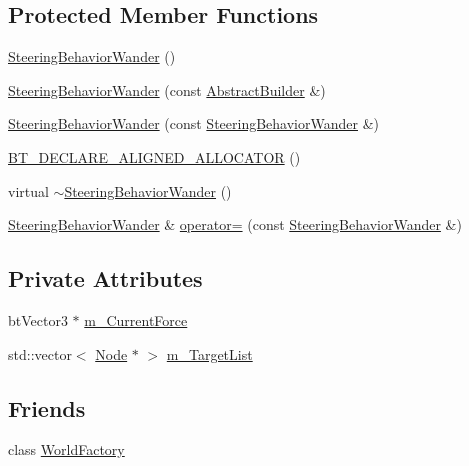 \subsection*{Protected Member Functions}
\begin{DoxyCompactItemize}
\item 
\mbox{\hyperlink{classnjli_1_1_steering_behavior_wander_a9df7b2411d18d7a36adc9066f57f9afe}{Steering\+Behavior\+Wander}} ()
\item 
\mbox{\hyperlink{classnjli_1_1_steering_behavior_wander_aef91f057e2256d6500e9eebe31a012af}{Steering\+Behavior\+Wander}} (const \mbox{\hyperlink{classnjli_1_1_abstract_builder}{Abstract\+Builder}} \&)
\item 
\mbox{\hyperlink{classnjli_1_1_steering_behavior_wander_a010a454d671b60eba4f5e2586c8391e6}{Steering\+Behavior\+Wander}} (const \mbox{\hyperlink{classnjli_1_1_steering_behavior_wander}{Steering\+Behavior\+Wander}} \&)
\item 
\mbox{\hyperlink{classnjli_1_1_steering_behavior_wander_a4f08dec3c9c5281c17d60b446f314594}{B\+T\+\_\+\+D\+E\+C\+L\+A\+R\+E\+\_\+\+A\+L\+I\+G\+N\+E\+D\+\_\+\+A\+L\+L\+O\+C\+A\+T\+OR}} ()
\item 
virtual \mbox{\hyperlink{classnjli_1_1_steering_behavior_wander_a7af63b5ca579d707815a2a55fc6625ba}{$\sim$\+Steering\+Behavior\+Wander}} ()
\item 
\mbox{\hyperlink{classnjli_1_1_steering_behavior_wander}{Steering\+Behavior\+Wander}} \& \mbox{\hyperlink{classnjli_1_1_steering_behavior_wander_a0b02a386b0acaa1e2af9fdefc149cf4d}{operator=}} (const \mbox{\hyperlink{classnjli_1_1_steering_behavior_wander}{Steering\+Behavior\+Wander}} \&)
\end{DoxyCompactItemize}
\subsection*{Private Attributes}
\begin{DoxyCompactItemize}
\item 
bt\+Vector3 $\ast$ \mbox{\hyperlink{classnjli_1_1_steering_behavior_wander_a8a1de347d2e1ed7fff87b6599e27a655}{m\+\_\+\+Current\+Force}}
\item 
std\+::vector$<$ \mbox{\hyperlink{classnjli_1_1_node}{Node}} $\ast$ $>$ \mbox{\hyperlink{classnjli_1_1_steering_behavior_wander_a23de8191e1cbf049343510609f059702}{m\+\_\+\+Target\+List}}
\end{DoxyCompactItemize}
\subsection*{Friends}
\begin{DoxyCompactItemize}
\item 
class \mbox{\hyperlink{classnjli_1_1_steering_behavior_wander_acb96ebb09abe8f2a37a915a842babfac}{World\+Factory}}
\end{DoxyCompactItemize}

